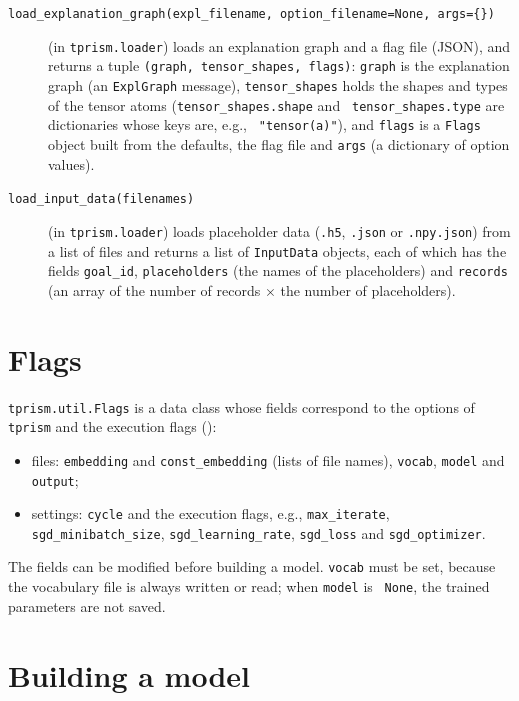 \documentclass[a4paper]{report}
\begin{document}
\begin{description}
	\item[{\tt load\_explanation\_graph(expl\_filename, option\_filename=None, args=\{\})}] (in {\tt tprism.loader})
	loads an explanation graph and a flag file (JSON), and returns a tuple
	{\tt (graph, tensor\_shapes, flags)}: {\tt graph} is the explanation graph
	(an {\tt ExplGraph} message), {\tt tensor\_shapes} holds the shapes and
	types of the tensor atoms ({\tt tensor\_shapes.shape} and {\tt
		tensor\_shapes.type} are dictionaries whose keys are, e.g., {\tt
		"tensor(a)"}), and {\tt flags} is a {\tt Flags} object built from the
	defaults, the flag file and {\tt args} (a dictionary of option values).
	\item[{\tt load\_input\_data(filenames)}] (in {\tt tprism.loader})
	loads placeholder data ({\tt .h5}, {\tt .json} or {\tt .npy.json}) from a
	list of files and returns a list of {\tt InputData} objects, each of which
	has the fields {\tt goal\_id}, {\tt placeholders} (the names of the
	placeholders) and {\tt records} (an array of the number of records
	$\times$ the number of placeholders).
\end{description}

\section{Flags}
\label{sec:api_flags}

{\tt tprism.util.Flags} is a data class whose fields correspond to the
options of {\tt tprism} and the execution flags ():
\begin{itemize}\raggedright
	\item files: {\tt embedding} and {\tt const\_embedding} (lists of file names), {\tt vocab}, {\tt model} and {\tt output};
	\item settings: {\tt cycle} and the execution flags, e.g.,
	{\tt max\_iterate}, {\tt sgd\_minibatch\_size}, {\tt sgd\_learning\_rate},
	{\tt sgd\_loss} and {\tt sgd\_optimizer}.
\end{itemize}
The fields can be modified before building a model.  {\tt vocab} must be set, because
the vocabulary file is always written or read; when {\tt model} is {\tt
	None}, the trained parameters are not saved.

\section{Building a model}
\label{sec:api_build}
\end{document}
